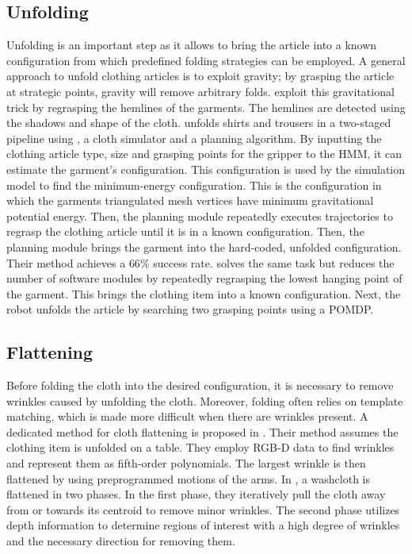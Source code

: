 \subsection{Unfolding}
Unfolding is an important step as it allows to bring the article into a known configuration from which predefined folding strategies can be employed. A general approach to unfold clothing articles is to exploit gravity; by grasping the article at strategic points, gravity will remove arbitrary folds. \Textcite{Hamajima1998} exploit this gravitational trick by regrasping the hemlines of the garments. The hemlines are detected using the shadows and shape of the cloth. \textcite{Cusumano2011} unfolds shirts and trousers in a two-staged pipeline using , a cloth simulator and a planning algorithm. By inputting the clothing article type, size and grasping points for the gripper to the \acrshort{HMM}, it can estimate the garment's configuration. This configuration is used by the simulation model to find the minimum-energy configuration. This is the configuration in which the garments triangulated mesh vertices have minimum gravitational potential energy. Then, the planning module repeatedly executes trajectories to regrasp the clothing article until it is in a known configuration. Then, the planning module brings the garment into the hard-coded, unfolded configuration. Their method achieves a $66\%$ success rate. \textcite{Doumanoglou2014} solves the same task but reduces the number of software modules by repeatedly regrasping the lowest hanging point of the garment. This brings the clothing item into a known configuration. Next, the robot unfolds the article by searching two grasping points using a \acrshort{POMDP}.

\subsection{Flattening}
Before folding the cloth into the desired configuration, it is necessary to remove wrinkles caused by unfolding the cloth.
Moreover, folding often relies on template matching, which is made more difficult when there are wrinkles present. A dedicated method for cloth flattening is proposed in \autocite{Sun2015}. Their method assumes the clothing item is unfolded on a table. They employ RGB-D data to find wrinkles and represent them as fifth-order polynomials. The largest wrinkle is then flattened by using preprogrammed motions of the arms. In \autocite{Willimon2011unfolding}, a washcloth is flattened in two phases. In the first phase, they iteratively pull the cloth away from or towards its centroid to remove minor wrinkles. The second phase utilizes depth information to determine regions of interest with a high degree of wrinkles and the necessary direction for removing them.

